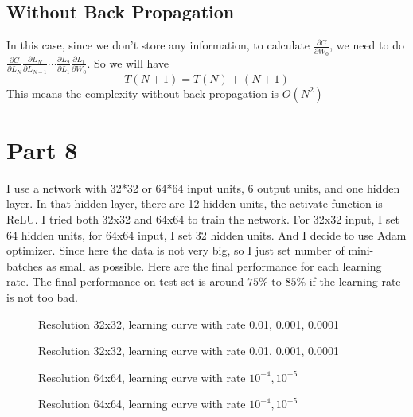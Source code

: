 \documentclass[12pt]{article}
\begin{document}
\subsection*{Without Back Propagation}
In this case, since we don't store any information, to calculate $\frac{\partial C}{\partial W_0}$, we need to do $\frac{\partial C}{\partial L_N}\frac{\partial L_N}{\partial L_{N-1}}\cdots \frac{\partial L_2}{\partial L_1}\frac{\partial L_1}{\partial W_0}$. So we will have
\[
    T(N+1) = T(N) + (N + 1)
\]
This means the complexity without back propagation is $O(N^2)$

\section*{Part 8}
I use a network with 32*32 or 64*64 input units, 6 output units, and one hidden layer. In that hidden layer, there are 12 hidden units, the activate function is ReLU. I tried both 32x32 and 64x64 to train the network. For 32x32 input, I set 64 hidden units, for 64x64 input, I set 32 hidden units. And I decide to use Adam optimizer. Since here the data is not very big, so I just set number of mini-batches as small as possible. Here are the final performance for each learning rate. The final performance on test set is around $75\%$ to $85\%$ if the learning rate is not too bad.
\begin{figure}[h]
    \qquad
    \qquad
    \caption{Resolution 32x32, learning curve with rate 0.01, 0.001, 0.0001}
\end{figure}
\begin{figure}[h]
    \qquad
    \qquad
    \caption{Resolution 32x32, learning curve with rate 0.01, 0.001, 0.0001}
\end{figure}
\begin{figure}[h]
    \qquad
    \caption{Resolution 64x64, learning curve with rate $10^{-4},10^{-5}$}
\end{figure}
\begin{figure}[H]
    \qquad
    \caption{Resolution 64x64, learning curve with rate $10^{-4},10^{-5}$}
\end{figure}
\end{document}
